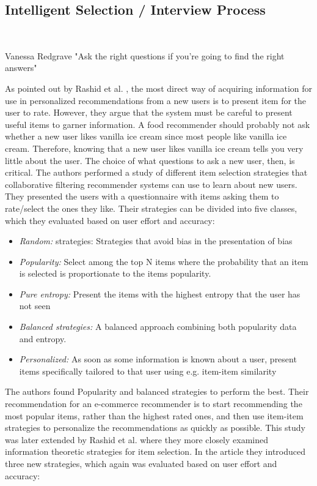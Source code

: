 \subsection{Intelligent Selection / Interview Process}\mbox{}\\

\begin{chapquote}[30pt]{Vanessa Redgrave}
  "Ask the right questions if you're going to find the right answers"
\end{chapquote}


As pointed out by Rashid et al. \cite{Rashid2002}, the most direct way of
acquiring information for use in personalized recommendations from a new users
is to present item for the user to rate. However, they argue that the system
must be careful to present useful items to garner information. A food
recommender should probably not ask whether a new user likes vanilla ice cream
since most people like vanilla ice cream. Therefore, knowing that a new user
likes vanilla ice cream tells you very little about the user. The choice of
what questions to ask a new user, then, is critical. The authors performed a
study of different item selection strategies that collaborative filtering
recommender systems can use to learn about new users. They presented the users
with a questionnaire with items asking them to rate/select the ones they like.
Their strategies can be divided into five classes, which they evaluated based
on user effort and accuracy:

\begin{itemize}
\item \emph{Random:} strategies: Strategies that avoid bias in the presentation
of bias
\item \emph{Popularity:} Select among the top N items where the probability
that an item is selected is proportionate to the items popularity.
\item \emph{Pure entropy:} Present the items with the highest entropy that the
user has not seen
\item \emph{Balanced strategies:} A balanced approach combining both popularity
data and entropy.
\item \emph{Personalized:} As soon as some information is known about a user,
present items specifically tailored to that user using e.g. item-item
similarity
\end{itemize}

The authors found Popularity and balanced strategies to perform the best. Their
recommendation for an e-commerce recommender is to start recommending the most
popular items, rather than the highest rated ones, and then use item-item
strategies to personalize the recommendations as quickly as possible. This
study was later extended by Rashid et al. \cite{Rashid2008} where they more
closely examined information theoretic strategies for item selection. In the
article they introduced three new strategies, which again was evaluated based
on user effort and accuracy:

